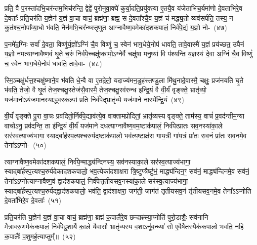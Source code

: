 प्रति॒ वै प॒रस्ता॑दभि॒चर॑न्तम॒भिच॑रन्ति॒ द्वेद्वे॑ पुरोनुवा॒क्ये॑ कुर्या॒दति॒प्रयु॑क्त्या ए॒तयै॒व य॑जेताभिच॒र्यमा॑णो दे॒वता॑भिरे॒व दे॒वताः᳚ प्रति॒चर॑ति य॒ज्ञेन॑ य॒ज्ञं वा॒चा वाचं॒ ब्रह्म॑णा॒ ब्रह्म॒ स दे॒वता᳚श्चै॒व य॒ज्ञं च॑ मद्ध्य॒तो व्यव॑सर्पति॒ तस्य॒ न कुत॑श्च॒नोपा᳚व्या॒धो भ॑वति॒ नैन॑मभि॒चर᳚न्थ्स्तृणुत आग्नावैष्ण॒वमेका॑\-दश\-कपालं॒ निर्व॑पे॒द्यं य॒ज्ञो नो-~(४७)\ip

प॒नमे॑द॒ग्निः सर्वा॑ दे॒वता॒ विष्णु॑र्य॒ज्ञो᳚\-ऽग्निं चै॒व विष्णुं॑ च॒ स्वेन॑ भाग॒धेये॒नोप॑ धावति॒ तावे॒वास्मै॑ य॒ज्ञं प्रय॑च्छत॒ उपै॑नं य॒ज्ञो न॑मत्याग्नावैष्ण॒वं घृ॒ते च॒रुं निर्व॑पे॒च्चक्षु॑ष्कामो॒\-ऽग्नेर्वै चक्षु॑षा मनु॒ष्या॑ वि प॑श्यन्ति य॒ज्ञस्य॑ दे॒वा अ॒ग्निं चै॒व विष्णुं॑ च॒ स्वेन॑ भाग॒धेये॒नोप॑ धावति॒ तावे॒वा-~(४८)\ip

स्मि॒ञ्चक्षु॑र्धत्त॒श्चक्षु॑ष्माने॒व भ॑वति धे॒न्वै वा ए॒तद्रेतो॒ यदाज्य॑मन॒डुह॑स्तण्डु॒ला मि॑थु॒नादे॒वास्मै॒ चक्षुः॒ प्रज॑नयति घृ॒ते भ॑वति॒ तेजो॒ वै घृ॒तं तेज॒श्चक्षु॒स्तेज॑सै॒वास्मै॒ तेज॒श्चक्षु॒रव॑रुन्ध इन्द्रि॒यं वै वी॒र्यं॑ वृङ्क्ते॒ भ्रातृ॑व्यो॒ यज॑मा॒नो\-ऽय॑जमानस्याद्ध्व॒रक॑ल्पां॒ प्रति॒ निर्व॑पे॒द्भ्रातृ॑व्ये॒ यज॑माने॒ नास्ये᳚न्द्रि॒यं~(४९)\ip

वी॒र्यं॑ वृङ्क्ते पु॒रा वा॒चः प्रव॑दितो॒र्निर्व॑पे॒द्याव॑त्ये॒व वाक्तामप्रो॑दितां॒ भ्रातृ॑व्यस्य वृङ्क्ते॒ ताम॑स्य॒ वाचं॑ प्र॒वद॑न्तीम॒न्या वाचो\-ऽनु॒ प्रव॑दन्ति॒ ता इ॑न्द्रि॒यं वी॒र्यं॑ यज॑माने दधत्याग्ना\-वैष्ण॒व\-म॒ष्टा\-क॑पालं॒ निर्व॑पेत्प्रातः सव॒नस्या॑का॒ले सर॑स्व॒त्याज्य॑भागा॒ स्याद्बा॑र्\mbox{}हस्प॒त्यश्च॒रुर्यद॒ष्टाक॑पालो॒ भव॑त्य॒ष्टाक्ष॑रा गाय॒त्री गा॑य॒त्रं प्रा॑तः सव॒नं प्रा॑तः सव॒नमे॒व तेना᳚\-ऽऽ\-प्नो-~(५०)\ip

त्याग्नावैष्ण॒वमेका॑\-दश\-कपालं॒ निर्व॑पे॒न्माद्ध्य॑न्दिनस्य॒ सव॑नस्या\-का॒ले सर॑स्व॒त्याज्य॑भागा॒ स्याद्बा॑र्\mbox{}हस्प॒त्यश्च॒रुर्यदेका॑\-दश\-कपालो॒ भव॒त्येका॑\-दशाक्षरा त्रि॒ष्टुप्त्रैष्टु॑भं॒ माद्ध्य॑न्दिन॒ꣳ॒ सव॑नं॒ माद्ध्य॑न्दिनमे॒व सव॑नं॒ तेना᳚\-ऽऽ\-प्नोत्याग्नावैष्ण॒वं द्वाद॑श\-कपालं॒ निर्व॑पेत्तृतीय\-सव॒नस्या॑\-का॒ले सर॑स्व॒त्याज्य॑भागा॒ स्याद्बा॑र्\mbox{}ह\-स्प॒त्यश्च॒रुर्यद्द्वाद॑श\-कपालो॒ भव॑ति॒ द्वाद॑शाक्षरा॒ जग॑ती॒ जाग॑तं तृतीयसव॒नं तृ॑तीयसव॒नमे॒व तेना᳚\-ऽऽ\-प्नोति दे॒वता॑भिरे॒व दे॒वताः᳚~(५१)\ip

प्रति॒चर॑ति य॒ज्ञेन॑ य॒ज्ञं वा॒चा वाचं॒ ब्रह्म॑णा॒ ब्रह्म॑ क॒पालै॑रे॒व छन्दाꣴ॑स्या॒प्नोति॑ पुरो॒डाशैः॒ सव॑नानि मैत्रावरु॒णमेक॑कपालं॒ निर्व॑पेद्व॒शायै॑ का॒ले यैवासौ भ्रातृ॑व्यस्य व॒शा\-ऽनू॑ब॒न्ध्या॑ सो ए॒वैषैतस्यैक॑कपालो भवति॒ नहि क॒पालैः᳚ प॒शुमर्\mbox{}ह॒त्याप्तुम्᳚॥~(५२)\ip

{\anuvakamend[{ब्रह्म॑णै॒वैन॑म॒भिच॑रति य॒ज्ञो न तावे॒वास्ये᳚न्द्रि॒यमा᳚प्नोति दे॒वताः᳚ स॒प्तत्रिꣳ॑शच्च।}]}

